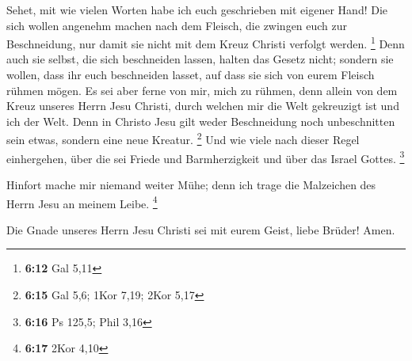  Sehet, mit wie vielen Worten habe ich euch geschrieben mit
eigener Hand!  Die sich wollen angenehm machen nach dem
Fleisch, die zwingen euch zur Beschneidung, nur damit sie nicht mit dem
Kreuz Christi verfolgt werden. \footnote{\textbf{6:12} Gal 5,11}
 Denn auch sie selbst, die sich beschneiden lassen, halten
das Gesetz nicht; sondern sie wollen, dass ihr euch beschneiden lasset,
auf dass sie sich von eurem Fleisch rühmen mögen.  Es sei
aber ferne von mir, mich zu rühmen, denn allein von dem Kreuz unseres
Herrn Jesu Christi, durch welchen mir die Welt gekreuzigt ist und ich
der Welt.  Denn in Christo Jesu gilt weder Beschneidung
noch unbeschnitten sein etwas, sondern eine neue Kreatur. \footnote{\textbf{6:15}
  Gal 5,6; 1Kor 7,19; 2Kor 5,17}  Und wie viele nach dieser
Regel einhergehen, über die sei Friede und Barmherzigkeit und über das
Israel Gottes. \footnote{\textbf{6:16} Ps 125,5; Phil 3,16}

 Hinfort mache mir niemand weiter Mühe; denn ich trage die
Malzeichen des Herrn Jesu an meinem Leibe. \footnote{\textbf{6:17} 2Kor
  4,10}

 Die Gnade unseres Herrn Jesu Christi sei mit eurem Geist,
liebe Brüder! Amen.
